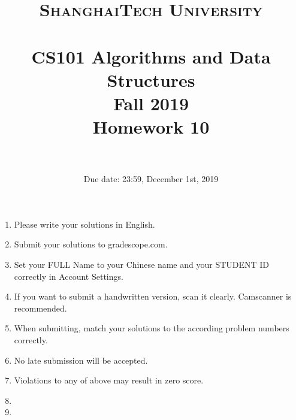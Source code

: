 \documentclass{article}
\title{
    \normalfont \normalsize
    \textsc{ShanghaiTech University} \\ [25pt]
    \horrule{0.5pt} \\[0.4cm] %
    \huge CS101 Algorithms and Data Structures\\ %
    \LARGE Fall 2019\\
    \LARGE Homework 10\\
    \horrule{2pt} \\[0.5cm] %
}
\author{}
\date{Due date: 23:59, December 1st, 2019}
\begin{document}
\maketitle
\thispagestyle{firstpage}
\vspace{3ex}

\begin{enumerate}
\item Please write your solutions in English. 

\item Submit your solutions to gradescope.com.  

\item Set your FULL Name to your Chinese name and your STUDENT ID correctly in Account Settings. 

\item If you want to submit a handwritten version, scan it clearly. Camscanner is recommended. 

\item When submitting, match your solutions to the according problem numbers correctly. 

\item No late submission will be accepted.

\item Violations to any of above may result in zero score. 

\item {\large\color{red}{In this homework, all the algorithm design part need the four part proof. The demand is in the next page. If you do not use the four part proof, you will not get any point.}}

\item {\large\color{red}{In the algorithm design problem, you should design the correct algorithm whose running time is equal or smaller than the correct answer. If it's larger than the correct answer, you cannot get any point.}}

\end{enumerate}
\newpage
\end{document}
